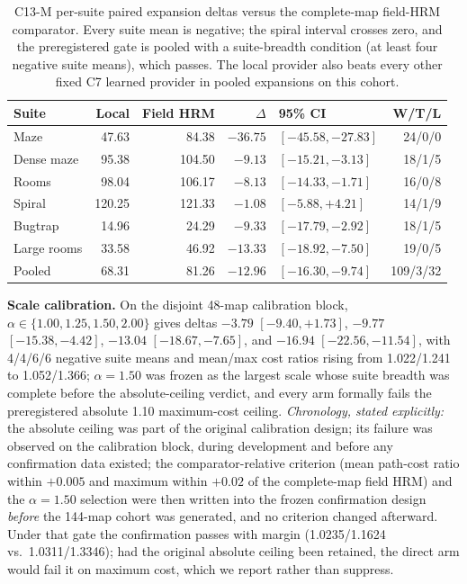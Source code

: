 \documentclass[letterpaper]{article} %
\newcommand{\stage}[1]{\textsc{#1}}
\begin{document}
\begin{table}[t]
\centering
\small
\setlength{\tabcolsep}{2.5pt}
\begin{tabular}{@{}lrrrlr@{}}
\toprule
Suite & Local & Field HRM & $\Delta$ & 95\% CI & W/T/L \\
\midrule
Maze & 47.63 & 84.38 & $-36.75$ & $[-45.58,-27.83]$ & 24/0/0 \\
Dense maze & 95.38 & 104.50 & $-9.13$ & $[-15.21,-3.13]$ & 18/1/5 \\
Rooms & 98.04 & 106.17 & $-8.13$ & $[-14.33,-1.71]$ & 16/0/8 \\
Spiral & 120.25 & 121.33 & $-1.08$ & $[-5.88,+4.21]$ & 14/1/9 \\
Bugtrap & 14.96 & 24.29 & $-9.33$ & $[-17.79,-2.92]$ & 18/1/5 \\
Large rooms & 33.58 & 46.92 & $-13.33$ & $[-18.92,-7.50]$ & 19/0/5 \\
\midrule
Pooled & 68.31 & 81.26 & $-12.96$ & $[-16.30,-9.74]$ & 109/3/32 \\
\bottomrule
\end{tabular}
\caption{\stage{C13-M} per-suite paired expansion deltas versus the complete-map field-HRM comparator. Every suite mean is negative; the spiral interval crosses zero, and the preregistered gate is pooled with a suite-breadth condition (at least four negative suite means), which passes. The local provider also beats every other fixed \stage{C7} learned provider in pooled expansions on this cohort.}
\label{tab:c13msuite}
\end{table}

\textbf{Scale calibration.} On the disjoint 48-map calibration block, $\alpha\in\{1.00,1.25,1.50,2.00\}$ gives deltas $-3.79$ $[-9.40,+1.73]$, $-9.77$ $[-15.38,-4.42]$, $-13.04$ $[-18.67,-7.65]$, and $-16.94$ $[-22.56,-11.54]$, with 4/4/6/6 negative suite means and mean/max cost ratios rising from 1.022/1.241 to 1.052/1.366; $\alpha{=}1.50$ was frozen as the largest scale whose suite breadth was complete before the absolute-ceiling verdict, and every arm formally fails the preregistered absolute 1.10 maximum-cost ceiling. \emph{Chronology, stated explicitly:} the absolute ceiling was part of the original calibration design; its failure was observed on the calibration block, during development and before any confirmation data existed; the comparator-relative criterion (mean path-cost ratio within $+0.005$ and maximum within $+0.02$ of the complete-map field HRM) and the $\alpha{=}1.50$ selection were then written into the frozen confirmation design \emph{before} the 144-map cohort was generated, and no criterion changed afterward. Under that gate the confirmation passes with margin (1.0235/1.1624 vs.\ 1.0311/1.3346); had the original absolute ceiling been retained, the direct arm would fail it on maximum cost, which we report rather than suppress.
\end{document}
